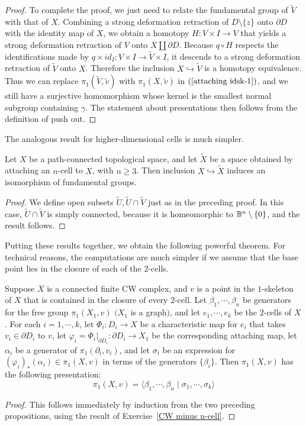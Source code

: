 \begin{proof}
To complete the proof, we just need to relate the fundamental group of $\widetilde{V}$ with that of $X$. Combining a strong deformation retraction of $D\setminus\{z\}$ onto $\partial D$ with the identity map of $X$, we obtain a homotopy $H:V\times I\to V$ that yields a strong deformation retraction of $V$ onto $X\amalg\partial D$. Because $q\circ H$ respects the identifications made by $q\times id_I:V\times I\to\widetilde{V}\times I$, it descends to a strong deformation retraction of $\widetilde{V}$ onto $X$. Therefore the inclusion $X\hookrightarrow\widetilde{V}$ is a homotopy equivalence. Thus we can replace $\pi_1(\widetilde{V},\widetilde{v})$ with $\pi_1(X,\widetilde{v})$ in $(\ref{attaching idsk-1})$, and we still have a surjective homomorphism whose kernel is the smallest normal subgroup containing $\gamma$. The statement about presentations then follows from the definition of push out.
\end{proof}
The analogous result for higher-dimensional cells is much simpler.
\begin{proposition}\label{attaching n cell}
Let $X$ be a path-connected topological space, and let $\widetilde{X}$ be a space obtained by attaching an $n$-cell to $X$, with $n\geq3$. Then inclusion $X\hookrightarrow\widetilde{X}$ induces an isomorphism of fundamental groups.
\end{proposition}
\begin{proof}
We define open subsets $\widetilde{U},\widetilde{U}\cap\widetilde{V}$ just as in the preceding proof. In this case, $\widetilde{U}\cap\widetilde{V}$ is simply connected, because it is homeomorphic to $\mathbb{B}^n\setminus\{0\}$, and the result follows.
\end{proof}
Putting these results together, we obtain the following powerful theorem. For technical reasons, the computations are much simpler if we assume that the base point lies in the closure of each of the $2$-cells.
\begin{theorem}
Suppose $X$ is a connected finite CW complex, and $v$ is a point in the $1$-skeleton of $X$ that is contained in the closure of every $2$-cell. Let $\beta_1,\cdots,\beta_n$ be generators for the free group $\pi_1(X_1,v)$ $($$X_1$ is a graph$)$, and let $e_1,\cdots,e_k$ be the $2$-cells of $X$. For each $i=1,\cdots,k$, let $\Phi_i:D_i\to X$ be a characteristic map for $e_i$ that takes $v_i\in\partial D_i$ to $v$, let $\varphi_i=\Phi_i|_{\partial D_i}:\partial D_i\to X_1$ be the corresponding attaching map, let $\alpha_i$ be a generator of $\pi_1(\partial_i,v_i)$, and let $\sigma_i$ be an expression for $(\varphi_i)_*(\alpha_i)\in\pi_1(X,v)$ in terms of the generators $\{\beta_i\}$. Then $\pi_1(X,v)$ has the following presentation:
\[\pi_1(X,v)=\langle\beta_1,\cdots,\beta_n\mid\sigma_1,\cdots,\sigma_k\rangle\]
\end{theorem}
\begin{proof}
This follows immediately by induction from the two preceding propositions,
using the result of Exercise~\ref{CW minus n-cell}.
\end{proof}
